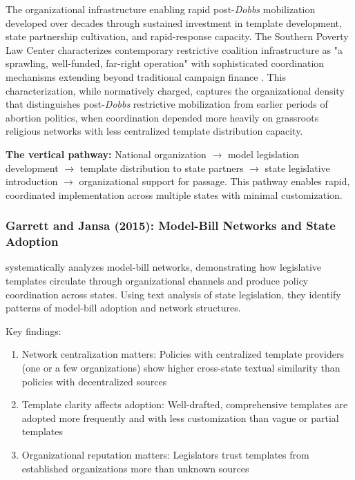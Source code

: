 The organizational infrastructure enabling rapid post-\textit{Dobbs} mobilization developed over decades through sustained investment in template development, state partnership cultivation, and rapid-response capacity. The Southern Poverty Law Center characterizes contemporary restrictive coalition infrastructure as "a sprawling, well-funded, far-right operation" with sophisticated coordination mechanisms extending beyond traditional campaign finance \parencite{millerLandscapeTodaysAntiAbortion2024}. This characterization, while normatively charged, captures the organizational density that distinguishes post-\textit{Dobbs} restrictive mobilization from earlier periods of abortion politics, when coordination depended more heavily on grassroots religious networks with less centralized template distribution capacity.

\textbf{The vertical pathway:} National organization $\rightarrow$ model legislation development $\rightarrow$ template distribution to state partners $\rightarrow$ state legislative introduction $\rightarrow$ organizational support for passage. This pathway enables rapid, coordinated implementation across multiple states with minimal customization.

\subsubsection{Garrett and Jansa (2015): Model-Bill Networks and State Adoption}

\textcite{garrettInterestGroupInfluence2015} systematically analyzes model-bill networks, demonstrating how legislative templates circulate through organizational channels and produce policy coordination across states. Using text analysis of state legislation, they identify patterns of model-bill adoption and network structures.

Key findings:

\begin{enumerate}
\item Network centralization matters: Policies with centralized template providers (one or a few organizations) show higher cross-state textual similarity than policies with decentralized sources
\item Template clarity affects adoption: Well-drafted, comprehensive templates are adopted more frequently and with less customization than vague or partial templates
\item Organizational reputation matters: Legislators trust templates from established organizations more than unknown sources
\end{enumerate}


